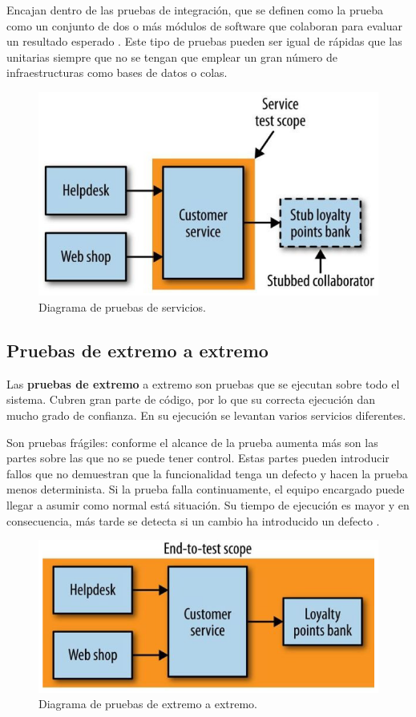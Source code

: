 \documentclass[11pt,spanish,listoffigures]{tfgetsinf}
\begin{document}
Encajan dentro de las pruebas de integración, que se definen como la prueba como un conjunto de dos o más módulos de software que colaboran para evaluar un resultado esperado \cite{Osherove2014}. Este tipo de pruebas pueden ser igual de rápidas que las unitarias siempre que no se tengan que emplear un gran número de infraestructuras como bases de datos o colas.

\begin{figure}[h]
\centering
\includegraphics[scale=0.5]{Service_Tests}
\caption{Diagrama de pruebas de servicios.}
\end{figure}

\subsection{Pruebas de extremo a extremo}

Las \textbf{pruebas de extremo} a extremo son pruebas que se ejecutan sobre todo el sistema. Cubren gran parte de código, por lo que su correcta ejecución dan mucho grado de confianza. En su ejecución se levantan varios servicios diferentes.

Son pruebas frágiles: conforme el alcance de la prueba aumenta más son las partes sobre las que no se puede tener control. Estas partes pueden introducir fallos que no demuestran que la funcionalidad tenga un defecto y hacen la prueba menos determinista. Si la prueba falla continuamente, el equipo encargado puede llegar a asumir como normal está situación. Su tiempo de ejecución es mayor y en consecuencia, más tarde se detecta si un cambio ha introducido un defecto \cite{Newman2015a}.

\begin{figure}[h]
\centering
\includegraphics[scale=0.5]{End_To_End_Test}
\caption{Diagrama de pruebas de extremo a extremo.}
\end{figure}
\end{document}
